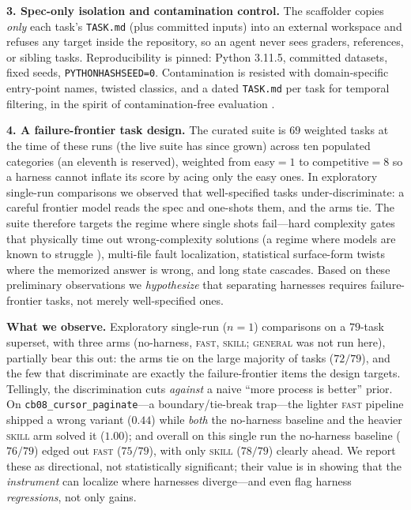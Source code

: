 \documentclass{article}
\begin{document}
\textbf{3. Spec-only isolation and contamination control.} The scaffolder copies
\emph{only} each task's \texttt{TASK.md} (plus committed inputs) into an external
workspace and refuses any target inside the repository, so an agent never sees
graders, references, or sibling tasks. Reproducibility is pinned: Python 3.11.5,
committed datasets, fixed seeds, \texttt{PYTHONHASHSEED=0}. Contamination is
resisted with domain-specific entry-point names, twisted classics, and a dated
\texttt{TASK.md} per task for temporal filtering, in the spirit of
contamination-free evaluation \citep{jain2024livecodebench}.

\textbf{4. A failure-frontier task design.} The curated suite is $69$ weighted
tasks at the time of these runs (the live suite has since grown) across ten
populated categories (an eleventh is reserved), weighted from easy$=1$ to
competitive$=8$ so a harness cannot inflate its score by acing only the easy
ones. In exploratory
single-run comparisons we observed that well-specified tasks under-discriminate:
a careful frontier model reads the spec and one-shots them, and the arms tie. The
suite therefore targets the regime where single shots fail---hard complexity
gates that physically time out wrong-complexity solutions (a regime where models
are known to struggle \citep{chambon2025bigobench}), multi-file fault
localization, statistical surface-form twists where the memorized answer is
wrong, and long state cascades. Based on these preliminary observations we
\emph{hypothesize} that separating harnesses requires failure-frontier tasks, not
merely well-specified ones.

\textbf{What we observe.} Exploratory single-run ($n{=}1$) comparisons on a
$79$-task superset, with three arms (no-harness, \textsc{fast}, \textsc{skill};
\textsc{general} was not run here), partially bear this out: the arms tie on the
large majority of tasks ($72/79$), and the few that discriminate are exactly the
failure-frontier items the design targets. Tellingly, the discrimination cuts
\emph{against} a naive ``more process is better'' prior. On
\texttt{cb08\_cursor\_paginate}---a boundary/tie-break trap---the lighter
\textsc{fast} pipeline shipped a wrong variant ($0.44$) while \emph{both} the
no-harness baseline and the heavier \textsc{skill} arm solved it ($1.00$); and
overall on this single run the no-harness baseline ($76/79$) edged out
\textsc{fast} ($75/79$), with only \textsc{skill} ($78/79$) clearly ahead. We
report these as directional, not statistically significant; their value is in
showing that the \emph{instrument} can localize where harnesses diverge---and even
flag harness \emph{regressions}, not only gains.
\end{document}

